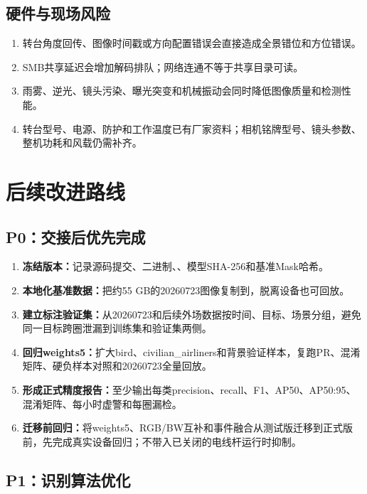 \documentclass[UTF8,a4paper,11pt,openany]{ctexrep}
\begin{document}
\section{硬件与现场风险}

\begin{enumerate}
  \item 转台角度回传、图像时间戳或方向配置错误会直接造成全景错位和方位错误。
  \item SMB共享延迟会增加解码排队；网络连通不等于共享目录可读。
  \item 雨雾、逆光、镜头污染、曝光突变和机械振动会同时降低图像质量和检测性能。
  \item 转台型号、电源、防护和工作温度已有厂家资料；相机铭牌型号、镜头参数、整机功耗和风载仍需补齐。
\end{enumerate}

\chapter{后续改进路线}

\section{P0：交接后优先完成}

\begin{enumerate}
  \item \textbf{冻结版本：}记录源码提交、二进制、、模型SHA-256和基准Mask哈希。
  \item \textbf{本地化基准数据：}把约55 GB的20260723图像复制到，脱离设备也可回放。
  \item \textbf{建立标注验证集：}从20260723和后续外场数据按时间、目标、场景分组，避免同一目标跨圈泄漏到训练集和验证集两侧。
  \item \textbf{回归weights5：}扩大bird、civilian\_airliners和背景验证样本，复跑PR、混淆矩阵、硬负样本对照和20260723全量回放。
  \item \textbf{形成正式精度报告：}至少输出每类precision、recall、F1、AP50、AP50:95、混淆矩阵、每小时虚警和每圈漏检。
  \item \textbf{迁移前回归：}将weights5、RGB/BW互补和事件融合从测试版迁移到正式版前，先完成真实设备回归；不带入已关闭的电线杆运行时抑制。
\end{enumerate}

\section{P1：识别算法优化}
\end{document}
